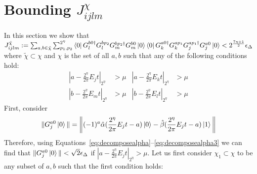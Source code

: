 \documentclass[aps,floatfix,10pt,amssymb,amsfont,amsmath,superscriptaddress,float,nofootinbib,longbibliography,nobalancelastpage,twocolumn]{revtex4-2}
\begin{document}
\section{Bounding $J^{\chi}_{ijlm}$}
\label{appendix:bound_J}
In this section we show that $J_{ijlm}^{\tilde\chi}:= \sum_{a,b\in \tilde \chi} \sum_{p_1,p_2}^{2^{\eta}}\bra{0} G^{b0\dagger}_lG^{bp_2}_lG^{bp_2\dagger}_mG^{b0}_m\ket{0}
    \bra{0}G_k^{a0\dagger}G_k^{ap_1}G_j^{ap_1\dagger}G_j^{a0}\ket{0} < 2^{\frac{7\eta+1}{2}}\epsilon_\Delta$ where $\tilde \chi \subset \chi$ and $\chi$ is the set of all $a,b$ such that any of the following conditions hold:
\begin{equation}
\begin{aligned}
    |a-\frac{2^{\eta}}{2\pi}E_jt|_{2^{\eta}} &> \mu  &|a-\frac{2^{\eta}}{2\pi}E_kt|_{2^{\eta}} &> \mu\\
    |b-\frac{2^{\eta}}{2\pi}E_mt|_{2^{\eta}} &> \mu   &|b-\frac{2^{\eta}}{2\pi}E_lt|_{2^{\eta}}& > \mu
\end{aligned}
\end{equation}
First, consider 
\begin{equation}
    \|G_j^{a0}\ket{0}\| = \bigg\| (-1)^a\hat \alpha(\frac{2^{\eta}}{2\pi}E_jt-a) \ket{0} -\hat\beta (\frac{2^{\eta}}{2\pi}E_jt-a)\ket{1} \bigg\|
\end{equation}
Therefore, using Equations~\eqref{eq:decomposealpha}--\eqref{eq:decomposealpha3} we can find that $\|G_j^{a0}\ket{0}\| < \sqrt{2} \epsilon_{\Delta}$  if $|a-\frac{2^{\eta}}{2\pi}E_jt|_{2^{\eta}} > \mu$. Let us first consider $\chi_1 \subset \chi$ to be any subset of $a,b$ such that the first condition holds:
\end{document}
